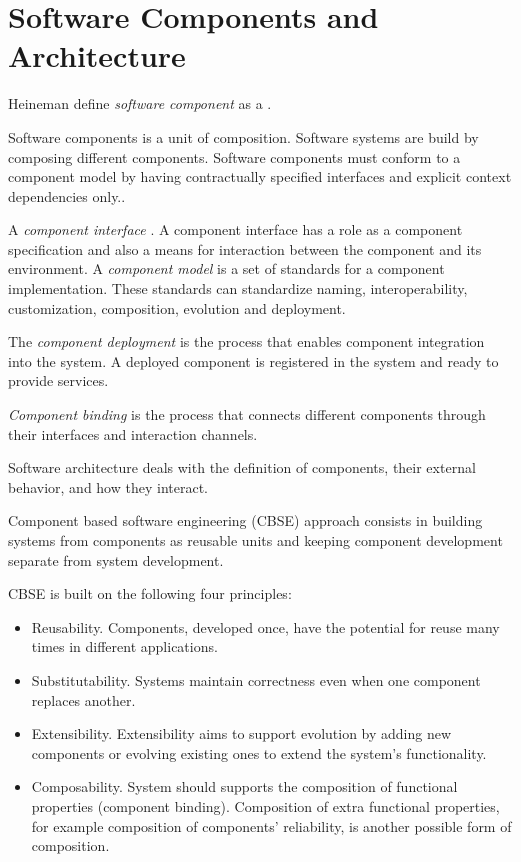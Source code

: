 \section{Software Components and Architecture}

Heineman define \textit{software component} as a
\cite{heineman_component-based_2001}.

Software components is a unit of composition. Software systems are build by composing different components.  Software components must conform to a component model by having contractually specified interfaces and explicit context dependencies only.\cite{szyperski_component_2002}.

A \textit{component	interface} \cite{crnkovic_software_2011}.
A component interface has a role as a component specification and also a means for interaction between the component and its environment.
A \textit{component model} is a set of standards for a component implementation. These standards can standardize naming, interoperability, customization, composition, evolution and deployment.\cite{heineman_component-based_2001}

The \textit{component deployment} is the process that enables component integration into the system. A deployed component is registered in the system and ready to provide services\cite{crnkovic_software_2011}.

\textit{Component binding} is the process that connects different components through their interfaces and interaction channels.

Software architecture deals with the definition of components, their external behavior, and how they interact.\cite{kaur_component_2010}

Component based software engineering (CBSE) approach consists in building systems from components as reusable units and keeping component development separate from system development\cite{crnkovic_software_2011}.

CBSE is built on the following four principles\cite{crnkovic_software_2011}:
\begin{itemize}
  \item Reusability. Components, developed once, have the potential for reuse many times in different applications.
  \item Substitutability. Systems maintain correctness even when one component replaces another.
  \item Extensibility. Extensibility aims to support evolution by adding new components or evolving existing ones to extend the system’s functionality.
  \item Composability. System should supports the composition of functional properties (component binding). Composition of extra functional properties, for example composition of components’ reliability, is another possible form of composition.
\end{itemize}
